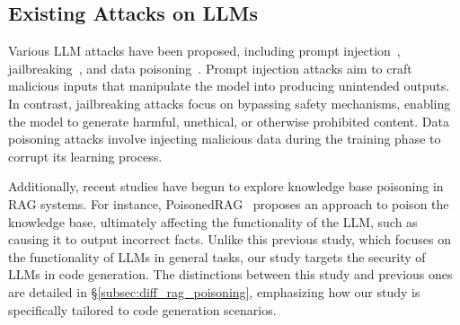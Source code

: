 \subsection{Existing Attacks on LLMs}

Various LLM attacks have been proposed, including prompt injection~\cite{liu2024formalizing,pedro2023prompt,perez2022ignore,liu2023prompt}, jailbreaking~\cite{li2023multi,qi2024visual,deng2024masterkey,zou2023universal,chen2024rmcbench}, and data poisoning~\cite{shafahi2018poison,biggio2012poisoning,carlini2024poisoning}. Prompt injection attacks aim to craft malicious inputs that manipulate the model into producing unintended outputs. In contrast, jailbreaking attacks focus on bypassing safety mechanisms, enabling the model to generate harmful, unethical, or otherwise prohibited content. Data poisoning attacks involve injecting malicious data during the training phase to corrupt its learning process.

Additionally, recent studies have begun to explore knowledge base poisoning in RAG systems. For instance, PoisonedRAG~\cite{zou2024poisonedrag} proposes an approach to poison the knowledge base, ultimately affecting the functionality of the LLM, such as causing it to output incorrect facts. Unlike this previous study, which focuses on the functionality of LLMs in general tasks, our study targets the security of LLMs in code generation.
The distinctions between this study and previous ones are detailed in \S\ref{subsec:diff_rag_poisoning}, emphasizing how our study is specifically tailored to code generation scenarios.